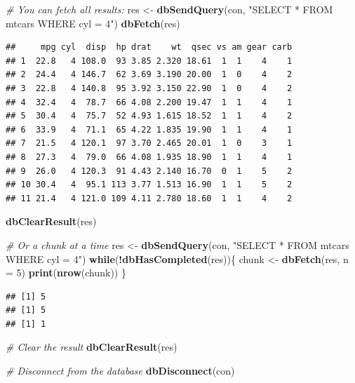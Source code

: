 \documentclass[
]{book}
\newenvironment{Shaded}{\begin{snugshade}}{\end{snugshade}}
\newcommand{\CommentTok}[1]{\textcolor[rgb]{0.56,0.35,0.01}{\textit{#1}}}
\newcommand{\ControlFlowTok}[1]{\textcolor[rgb]{0.13,0.29,0.53}{\textbf{#1}}}
\newcommand{\DataTypeTok}[1]{\textcolor[rgb]{0.13,0.29,0.53}{#1}}
\newcommand{\DecValTok}[1]{\textcolor[rgb]{0.00,0.00,0.81}{#1}}
\newcommand{\KeywordTok}[1]{\textcolor[rgb]{0.13,0.29,0.53}{\textbf{#1}}}
\newcommand{\NormalTok}[1]{#1}
\newcommand{\OperatorTok}[1]{\textcolor[rgb]{0.81,0.36,0.00}{\textbf{#1}}}
\newcommand{\StringTok}[1]{\textcolor[rgb]{0.31,0.60,0.02}{#1}}
\begin{document}
\begin{Shaded}
\begin{Highlighting}[]
\CommentTok{# You can fetch all results:}
\NormalTok{res <-}\StringTok{ }\KeywordTok{dbSendQuery}\NormalTok{(con, }\StringTok{"SELECT * FROM mtcars WHERE cyl = 4"}\NormalTok{)}
\KeywordTok{dbFetch}\NormalTok{(res)}
\end{Highlighting}
\end{Shaded}

\begin{verbatim}
##     mpg cyl  disp  hp drat    wt  qsec vs am gear carb
## 1  22.8   4 108.0  93 3.85 2.320 18.61  1  1    4    1
## 2  24.4   4 146.7  62 3.69 3.190 20.00  1  0    4    2
## 3  22.8   4 140.8  95 3.92 3.150 22.90  1  0    4    2
## 4  32.4   4  78.7  66 4.08 2.200 19.47  1  1    4    1
## 5  30.4   4  75.7  52 4.93 1.615 18.52  1  1    4    2
## 6  33.9   4  71.1  65 4.22 1.835 19.90  1  1    4    1
## 7  21.5   4 120.1  97 3.70 2.465 20.01  1  0    3    1
## 8  27.3   4  79.0  66 4.08 1.935 18.90  1  1    4    1
## 9  26.0   4 120.3  91 4.43 2.140 16.70  0  1    5    2
## 10 30.4   4  95.1 113 3.77 1.513 16.90  1  1    5    2
## 11 21.4   4 121.0 109 4.11 2.780 18.60  1  1    4    2
\end{verbatim}

\begin{Shaded}
\begin{Highlighting}[]
\KeywordTok{dbClearResult}\NormalTok{(res)}

\CommentTok{# Or a chunk at a time}
\NormalTok{res <-}\StringTok{ }\KeywordTok{dbSendQuery}\NormalTok{(con, }\StringTok{"SELECT * FROM mtcars WHERE cyl = 4"}\NormalTok{)}
\ControlFlowTok{while}\NormalTok{(}\OperatorTok{!}\KeywordTok{dbHasCompleted}\NormalTok{(res))\{}
\NormalTok{  chunk <-}\StringTok{ }\KeywordTok{dbFetch}\NormalTok{(res, }\DataTypeTok{n =} \DecValTok{5}\NormalTok{)}
  \KeywordTok{print}\NormalTok{(}\KeywordTok{nrow}\NormalTok{(chunk))}
\NormalTok{\}}
\end{Highlighting}
\end{Shaded}

\begin{verbatim}
## [1] 5
## [1] 5
## [1] 1
\end{verbatim}

\begin{Shaded}
\begin{Highlighting}[]
\CommentTok{# Clear the result}
\KeywordTok{dbClearResult}\NormalTok{(res)}

\CommentTok{# Disconnect from the database}
\KeywordTok{dbDisconnect}\NormalTok{(con)}
\end{Highlighting}
\end{Shaded}
\end{document}
